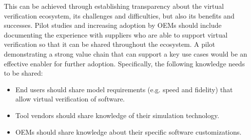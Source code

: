 This can be achieved through establishing transparency about the virtual verification ecosystem, its challenges and difficulties, but also its benefits and successes. 
Pilot studies and increasing adoption by OEMs should include documenting the experience with suppliers who are able to support virtual verification so that it can be shared throughout the ecosystem.
A pilot demonstrating a strong value chain that can support a key use cases would be an effective enabler for further adoption.
Specifically, the following knowledge needs to be shared:
\begin{itemize}
  \item End users should share model requirements (e.g. speed and fidelity) that allow virtual verification of software.
  \item Tool vendors should share knowledge of their simulation technology.
  \item OEMs should share knowledge about their specific software customizations.
\end{itemize}